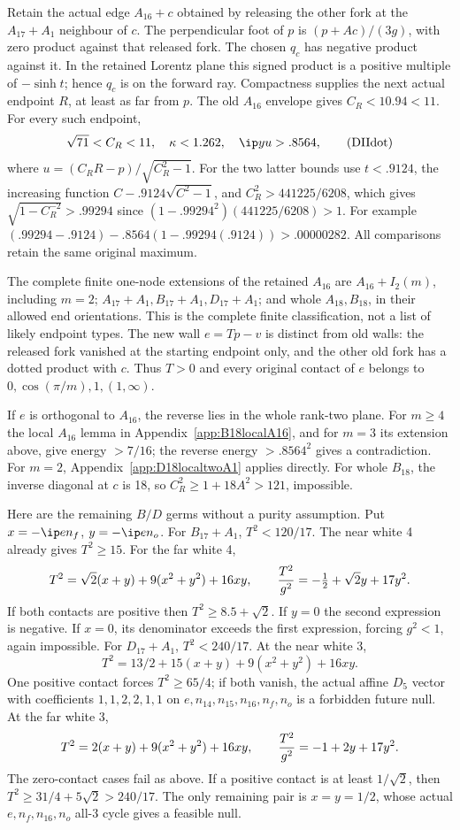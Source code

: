 Retain the actual edge \(A_{16}+c\) obtained by releasing the other
fork at the \(A_{17}+A_1\) neighbour of \(c\).
The perpendicular foot of \(p\) is
\((p+Ac)/(3g)\), with zero product against that released fork.
The chosen \(q_c\) has negative product against it.
In the retained Lorentz plane this signed product is a positive
multiple of \(-\sinh t\); hence \(q_c\) is on the forward ray.
Compactness supplies the next actual endpoint \(R\), at least as
far from \(p\).  The old \(A_{16}\) envelope gives \(C_R<10.94<11\).
For every such endpoint,
\[
 \sqrt{71}<C_R<11,\quad
 \kappa<1.262,\quad \ip yu>.8564 ,
\tag{DIIdot}\label{eq:DIIdot}
\]
where \(u=(C_RR-p)/\sqrt{C_R^2-1}\).
For the two latter bounds use \(t<.9124\), the increasing function
\(C-.9124\sqrt{C^2-1}\), and
\(C_R^2>441225/6208\), which gives
\(\sqrt{1-C_R^{-2}}>.99294\) since
\((1-.99294^2)(441225/6208)>1\).
For example
\((.99294-.9124)-.8564(1-.99294(.9124))>.00000282\).
All comparisons retain the same original maximum.

The complete finite one-node extensions of the retained \(A_{16}\)
are \(A_{16}+I_2(m)\), including \(m=2\);
\(A_{17}+A_1,B_{17}+A_1,D_{17}+A_1\);
and whole \(A_{18},B_{18}\), in their allowed end orientations.
This is the complete finite classification, not a list of likely
endpoint types.  The new wall \(e=Tp-v\) is distinct from old
walls: the released fork vanished at the starting endpoint only,
and the other old fork has a dotted product with \(c\).
Thus \(T>0\) and every original contact of \(e\) belongs to
\(0,\cos(\pi/m),1,(1,\infty)\).

If \(e\) is orthogonal to \(A_{16}\), the reverse lies in the whole
rank-two plane.  For \(m\ge4\) the local \(A_{16}\) lemma in
Appendix~\ref{app:B18localA16}, and for \(m=3\) its extension
above, give energy \(>7/16\); the reverse energy
\(>.8564^2\) gives a contradiction.
For \(m=2\), Appendix~\ref{app:D18localtwoA1} applies directly.
For whole \(B_{18}\), the inverse diagonal at \(c\) is 18, so
\(C_R^2\ge1+18A^2>121\), impossible.

Here are the remaining \(B/D\) germs without a purity assumption.
Put \(x=-\ip e{n_f}\), \(y=-\ip e{n_o}\).
For \(B_{17}+A_1\), \(T^2<120/17\).
The near white 4 already gives \(T^2\ge15\).
For the far white 4,
\[
 T^2=\sqrt2(x+y)+9(x^2+y^2)+16xy,\qquad
 {T^2\over g^2}=-\tfrac12+\sqrt2y+17y^2 .
\]
If both contacts are positive then \(T^2\ge8.5+\sqrt2\).
If \(y=0\) the second expression is negative.
If \(x=0\), its denominator exceeds the first expression, forcing
\(g^2<1\), again impossible.
For \(D_{17}+A_1\), \(T^2<240/17\).
At the near white 3,
\[
 T^2=13/2+15(x+y)+9(x^2+y^2)+16xy .
\]
One positive contact forces \(T^2\ge65/4\); if both vanish,
the actual affine \(D_5\) vector with coefficients \(1,1,2,2,1,1\)
on \(e,n_{14},n_{15},n_{16},n_f,n_o\) is a forbidden future null.
At the far white 3,
\[
 T^2=2(x+y)+9(x^2+y^2)+16xy,\qquad
 {T^2\over g^2}=-1+2y+17y^2 .
\]
The zero-contact cases fail as above.
If a positive contact is at least \(1/\sqrt2\), then
\(T^2\ge31/4+5\sqrt2>240/17\).
The only remaining pair is \(x=y=1/2\), whose actual
\(e,n_f,n_{16},n_o\) all-3 cycle gives a feasible null.

